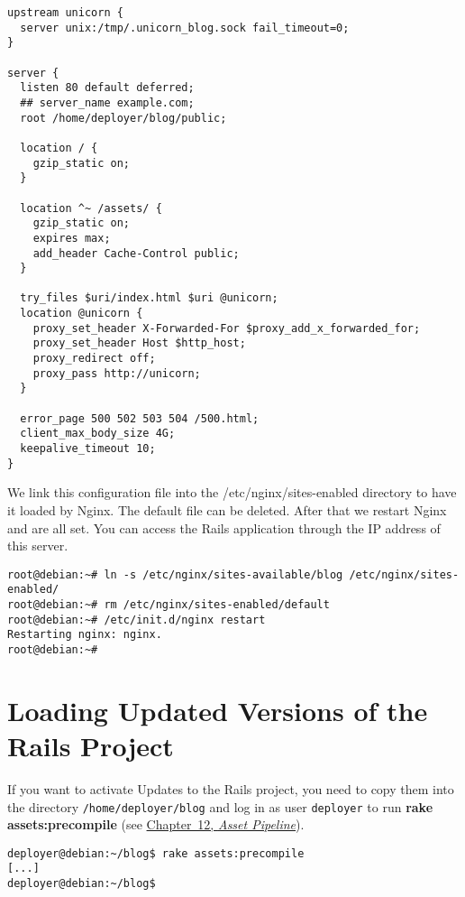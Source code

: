 \documentclass[a4paper]{book}
\newcommand{\chap}[1]{\newpage\thispagestyle{empty}\chapter{#1}\label{chap:\thechapter}}
\begin{document}
\begin{shaded}\begin{verbatim}
upstream unicorn {
  server unix:/tmp/.unicorn_blog.sock fail_timeout=0;
}

server {
  listen 80 default deferred;
  ## server_name example.com;
  root /home/deployer/blog/public;

  location / {
    gzip_static on;
  }

  location ^~ /assets/ {
    gzip_static on;
    expires max;
    add_header Cache-Control public;
  }

  try_files $uri/index.html $uri @unicorn;
  location @unicorn {
    proxy_set_header X-Forwarded-For $proxy_add_x_forwarded_for;
    proxy_set_header Host $http_host;
    proxy_redirect off;
    proxy_pass http://unicorn;
  }

  error_page 500 502 503 504 /500.html;
  client_max_body_size 4G;
  keepalive_timeout 10;
}
\end{verbatim}\end{shaded}

We link this configuration file into the /etc/nginx/sites-enabled directory to have it loaded by Nginx. The default file can be deleted. After that we restart Nginx and are all set. You can access the Rails application through the IP address of this server.

\begin{shaded}\begin{verbatim}
root@debian:~# ln -s /etc/nginx/sites-available/blog /etc/nginx/sites-enabled/
root@debian:~# rm /etc/nginx/sites-enabled/default
root@debian:~# /etc/init.d/nginx restart
Restarting nginx: nginx.
root@debian:~#
\end{verbatim}\end{shaded}

\chap{Loading Updated Versions of the Rails Project}\label{loading-updated-versions-of-the-rails-project}

If you want to activate Updates to the Rails project, you need to copy them into the directory \texttt{/home/deployer/blog} and log in as user \texttt{deployer} to run \textbf{rake assets:precompile} (see \hyperref[assetux5fpipeline]{Chapter~12, \emph{Asset Pipeline}}).

\begin{shaded}\begin{verbatim}
deployer@debian:~/blog$ rake assets:precompile
[...]
deployer@debian:~/blog$
\end{verbatim}\end{shaded}
\end{document}
